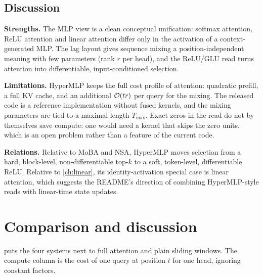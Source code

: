 \subsection{Discussion}

\textbf{Strengths.} The MLP view is a clean conceptual unification: softmax attention, ReLU
attention and linear attention differ only in the activation of a context-generated MLP. The lag
layout gives sequence mixing a position-independent meaning with few parameters (rank $r$ per
head), and the ReLU/GLU read turns attention into differentiable, input-conditioned selection.

\textbf{Limitations.} HyperMLP keeps the full cost profile of attention: quadratic prefill, a full
KV cache, and an additional $\mathcal{O}(tr)$ per query for the mixing. The released code is a reference
implementation without fused kernels, and the mixing parameters are tied to a maximal length
$T_{\max}$. Exact zeros in the read do not by themselves save compute: one would need a kernel that
skips the zero units, which is an open problem rather than a feature of the current code.

\textbf{Relations.} Relative to MoBA and NSA, HyperMLP moves selection from a hard, block-level,
non-differentiable top-$k$ to a soft, token-level, differentiable ReLU. Relative to
\cref{ch:linear}, its identity-activation special case is linear attention, which suggests the
README's direction of combining HyperMLP-style reads with linear-time state updates.

\section{Comparison and discussion}\label{sec:c04-comparison}

 puts the four systems next to full attention and plain sliding windows. The
compute column is the cost of one query at position $t$ for one head, ignoring constant factors.

